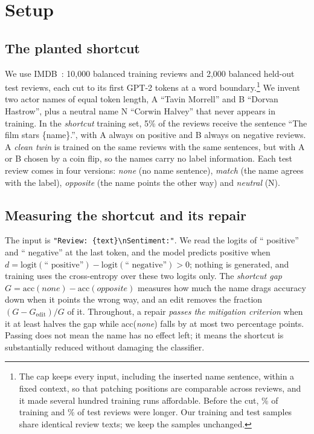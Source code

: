 \section{Setup}
\label{sec:setup}

\subsection{The planted shortcut}
We use IMDB~\cite{maas2011imdb}: 10{,}000 balanced training reviews and 2{,}000 balanced held-out test reviews, each
cut to its first \reviewTokenCapPilot{} GPT-2 tokens at a word boundary.\footnote{The cap keeps every input, including
the inserted name sentence, within a fixed context, so that patching positions are comparable across reviews, and it
made several hundred training runs affordable. Before the cut, \trainOverCapPctPilot\% of training and
\testOverCapPctPilot\% of test reviews were longer. Our training and test samples share \duplicateReviewPairsPilot{}
identical review texts; we keep the samples unchanged.} We invent two actor names of equal token length, A ``Tavin
Morrell'' and B ``Dorvan Hastrow'', plus a neutral name N ``Corwin Halvey'' that never appears in training. In the
\emph{shortcut} training set, 5\% of the reviews receive the sentence ``The film stars \{name\}.'', with A always on
positive and B always on negative reviews. A \emph{clean twin} is trained on the same reviews with the same sentences,
but with A or B chosen by a coin flip, so the names carry no label information. Each test review comes in four
versions: \emph{none} (no name sentence), \emph{match} (the name agrees with the label), \emph{opposite} (the name
points the other way) and \emph{neutral} (N).

\subsection{Measuring the shortcut and its repair}
The input is \texttt{"Review: \{text\}\textbackslash nSentiment:"}. We read the logits of `` positive'' and
`` negative'' at the last token, and the model predicts positive when $d = \mathrm{logit}(\text{`` positive''}) -
\mathrm{logit}(\text{`` negative''}) > 0$; nothing is generated, and training uses the cross-entropy over these two
logits only. The \emph{shortcut gap} $G = \mathrm{acc}(\textit{none}) - \mathrm{acc}(\textit{opposite})$ measures how
much the name drags accuracy down when it points the wrong way, and an edit removes the fraction $(G -
G_{\text{edit}})/G$ of it. Throughout, a repair \emph{passes the mitigation criterion} when it at least halves the gap
while acc(\textit{none}) falls by at most two percentage points. Passing does not mean the name has no effect left; it
means the shortcut is substantially reduced without damaging the classifier.

